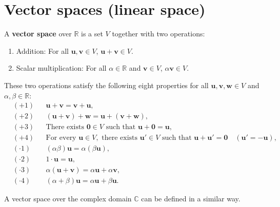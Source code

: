 \documentclass{huhtakm-template-book-v2}
\begin{document}
\section{Vector spaces (linear space)}
    \begin{defn}
        A \textbf{vector space} over $\mathbb{R}$ is a set $V$ together with two operations:
        \begin{enumerate}
            \item Addition: For all $\mathbf{u}, \mathbf{v} \in V$, $\mathbf{u} + \mathbf{v} \in V$.
            \item Scalar multiplication: For all $\alpha \in \mathbb{R}$ and $\mathbf{v} \in V$, $\alpha \mathbf{v} \in V$.
        \end{enumerate}
        These two operations satisfy the following eight properties for all $\mathbf{u}, \mathbf{v}, \mathbf{w} \in V$ and $\alpha, \beta \in \mathbb{R}$:
        \begin{align*}
            \tag{Addition Commutativity}
            &(+1) & &\mathbf{u} + \mathbf{v} = \mathbf{v} + \mathbf{u},\\
            \tag{Addition Associativity}
            &(+2) & &(\mathbf{u} + \mathbf{v}) + \mathbf{w} = \mathbf{u} + (\mathbf{v} + \mathbf{w}),\\
            \tag{Zero Exists}
            &(+3) & &\text{There exists } \mathbf{0} \in V \text{ such that } \mathbf{u} + \mathbf{0} = \mathbf{u},\\
            \tag{Additive Inverse Exists}
            &(+4) & &\text{For every } \mathbf{u} \in V, \text{ there exists } \mathbf{u}' \in V \text{ such that } \mathbf{u} + \mathbf{u}' = \mathbf{0} \quad (\mathbf{u}' = -\mathbf{u}),\\
            \tag{Multiplication Associativity}
            &(\cdot 1) & &(\alpha \beta)\mathbf{u} = \alpha(\beta \mathbf{u}),\\
            \tag{Unity}
            &(\cdot 2) & & 1 \cdot \mathbf{u} = \mathbf{u},\\
            \tag{Distributivity 1}
            &(\cdot 3) & & \alpha(\mathbf{u} + \mathbf{v}) = \alpha \mathbf{u} + \alpha \mathbf{v},\\
            \tag{Distributivity 2}
            &(\cdot 4) & & (\alpha + \beta)\mathbf{u} = \alpha \mathbf{u} + \beta \mathbf{u}.
        \end{align*}
    \end{defn}
    \begin{rem}
        A vector space over the complex domain $\mathbb{C}$ can be defined in a similar way.
    \end{rem}
\end{document}

